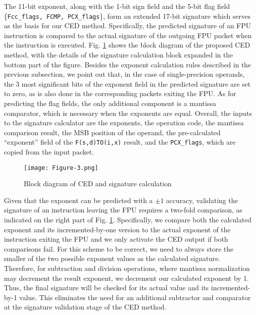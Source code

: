 \documentclass[12pt]{yalephd}
\newcommand{\subsubsubsection}[1] {\noindent {\underline {#1}}}
\begin{document}
\subsubsubsection{Signature calculation \& validation}\label{sC3sFPU_SIG}

The 11-bit exponent, along with the 1-bit sign field and the 5-bit flag field \{{\tt Fcc\_flags, FCMP, PCX\_flags}\}, form an extended 17-bit signature which serves as the basis for our CED method. Specifically, the predicted signature of an FPU instruction is compared to the actual signature of the outgoing FPU packet when the instruction is executed. Fig. \ref{sC3fCEDExpCalc} shows the block diagram of the proposed CED method, with the details of the signature calculation block expanded in the bottom part of the figure. Besides the exponent calculation rules described in the previous subsection, we point out that, in the case of single-precision operands, the 3 most significant bits of the exponent field in the predicted signature are set to zero, as is also done in the corresponding packets exiting the FPU. As for predicting the flag fields, the only additional component is a mantissa comparator, which is necessary when the exponents are equal. Overall, the inputs to the signature calculator are the exponents, the operation code, the mantissa comparison result, the MSB position of the operand, the pre-calculated ``exponent'' field of the {\tt F(s,d)TO(i,x)} result, and the {\tt PCX\_flags}, which are copied from the input packet.

\begin{figure}[!ht]
\centering
\texttt{[image: Figure-3.png]}
\caption{Block diagram of CED and signature calculation}\label{sC3fCEDExpCalc}
\end{figure}

Given that the exponent can be predicted with a $\pm 1$ accuracy, validating the signature of an instruction leaving the FPU requires a two-fold comparison, as indicated on the right part of Fig. \ref{sC3fCEDExpCalc}. Specifically, we compare both the calculated exponent and its incremented-by-one version to the actual exponent of the instruction exiting the FPU and we only activate the CED output if both comparisons fail. For this scheme to be correct, we need to always store the smaller of the two possible exponent values as the calculated signature. Therefore, for subtraction and division operations, where mantissa normalization may decrement the result exponent, we decrement our calculated exponent by 1. Thus, the final signature will be checked for its actual value and its incremented-by-1 value. This eliminates the need for an additional subtractor and comparator at the signature validation stage of the CED method.
\end{document}
